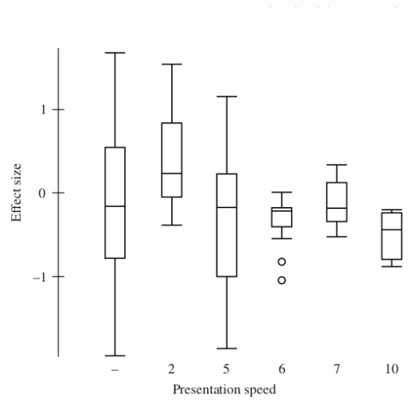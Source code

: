 \documentclass{beamer}
\begin{document}
\begin{frame}
  \begin{center}
    \includegraphics[height=0.7\textheight]{eda-boxplot2}
  \end{center}
\end{frame}
\end{document}
